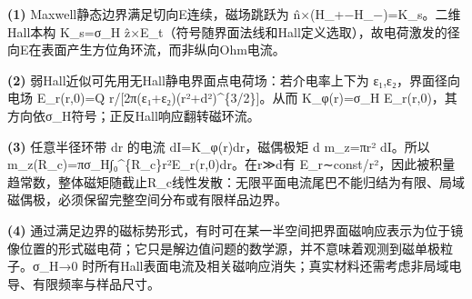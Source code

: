 \par\noindent\textbf{(1)} Maxwell静态边界满足切向E连续，磁场跳跃为 n̂×(H\_+−H\_−)=K\_s。二维Hall本构 K\_s=σ\_H ẑ×E\_t（符号随界面法线和Hall定义选取），故电荷激发的径向E在表面产生方位角环流，而非纵向Ohm电流。
\par\noindent\textbf{(2)} 弱Hall近似可先用无Hall静电界面点电荷场：若介电率上下为 ε₁,ε₂，界面径向电场 E\_r(r,0)=Q r/[2π(ε₁+ε₂)(r²+d²)\textasciicircum{}\{3/2\}]。从而 K\_φ(r)=σ\_H E\_r(r,0)，其方向依σ\_H符号；正反Hall响应翻转磁环流。
\par\noindent\textbf{(3)} 任意半径环带 dr 的电流 dI=K\_φ(r)dr，磁偶极矩 d m\_z=πr² dI。所以 m\_z(R\_c)=πσ\_H∫₀\textasciicircum{}\{R\_c\}r²E\_r(r,0)dr。在r≫d有 E\_r∼const/r²，因此被积量趋常数，整体磁矩随截止R\_c线性发散：无限平面电流尾巴不能归结为有限、局域磁偶极，必须保留完整空间分布或有限样品边界。
\par\noindent\textbf{(4)} 通过满足边界的磁标势形式，有时可在某一半空间把界面磁响应表示为位于镜像位置的形式磁电荷；它只是解边值问题的数学源，并不意味着观测到磁单极粒子。σ\_H→0 时所有Hall表面电流及相关磁响应消失；真实材料还需考虑非局域电导、有限频率与样品尺寸。
